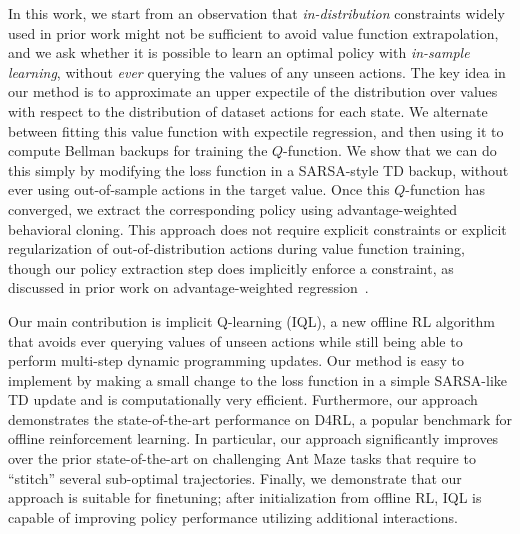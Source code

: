 \documentclass{article} %
\def\ourname{IQL\xspace}
\def\ournamepref{implicit\xspace}
\begin{document}
In this work, we start from an observation that \emph{in-distribution} constraints widely used in prior work might not be sufficient to avoid value function extrapolation, and we ask whether it is possible to learn an optimal policy with \emph{in-sample learning}, without \emph{ever} querying the values of any unseen actions.
The key idea in our method is to approximate an upper expectile of the distribution over values with respect to the distribution of dataset actions for each state. We alternate between fitting this value function with expectile regression, and then using it to compute Bellman backups for training the $Q$-function.
We show that we can do this simply by modifying the loss function in a SARSA-style TD backup, without ever using out-of-sample actions in the target value.
Once this $Q$-function has converged, we extract the corresponding policy using advantage-weighted behavioral cloning.
This approach does not require explicit constraints or explicit regularization of out-of-distribution actions during value function training, though our policy extraction step does implicitly enforce a constraint, as discussed in prior work on advantage-weighted regression~\citep{peters2007reinforcement, peng2019advantage, nair2020awac, wang2020critic}.

Our main contribution is \ournamepref Q-learning (\ourname), a new offline RL algorithm that avoids ever querying values of unseen actions while still being able to perform multi-step dynamic programming updates.
Our method is easy to implement by making a small change to the loss function in a simple SARSA-like TD update and is computationally very efficient. Furthermore, our approach demonstrates the state-of-the-art performance on D4RL, a popular benchmark for offline reinforcement learning. In particular, our approach significantly improves over the prior state-of-the-art on challenging Ant Maze tasks that require to ``stitch'' several sub-optimal trajectories. Finally, we demonstrate that our approach is suitable for finetuning; after initialization from offline RL, \ourname is capable of improving policy performance utilizing additional interactions.
\end{document}
